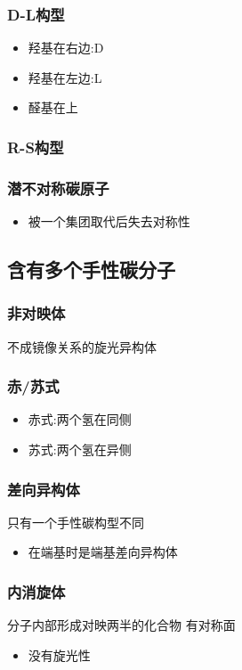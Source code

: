 \documentclass[11pt]{article}
\begin{document}
\subsubsection{D-L构型}
\label{sec:orgc31a695}
\begin{itemize}
\item 羟基在右边:D
\item 羟基在左边:L
\item 醛基在上
\end{itemize}
\subsubsection{R-S构型}
\label{sec:org6d9aca2}
\subsubsection{潜不对称碳原子}
\label{sec:org04f987e}
\begin{itemize}
\item 被一个集团取代后失去对称性
\end{itemize}
\subsection{含有多个手性碳分子}
\label{sec:org46b2358}
\subsubsection{非对映体}
\label{sec:orgf5e8eec}
不成镜像关系的旋光异构体
\subsubsection{赤/苏式}
\label{sec:org4d4c56b}
\begin{itemize}
\item 赤式:两个氢在同侧
\item 苏式:两个氢在异侧
\end{itemize}
\subsubsection{差向异构体}
\label{sec:org83f76f1}
只有一个手性碳构型不同
\begin{itemize}
\item 在端基时是端基差向异构体
\end{itemize}

\subsubsection{内消旋体}
\label{sec:org2dfc7c8}
分子内部形成对映两半的化合物
有对称面
\begin{itemize}
\item 没有旋光性
\end{itemize}
\end{document}
